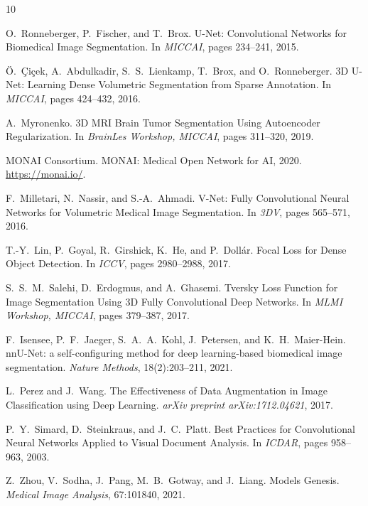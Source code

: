 \documentclass[10pt,twocolumn]{article}
\begin{document}

\begin{thebibliography}{10}

O.~Ronneberger, P.~Fischer, and T.~Brox.
\newblock U-Net: Convolutional Networks for Biomedical Image Segmentation.
\newblock In \emph{MICCAI}, pages 234--241, 2015.

\"{O}.~\c{C}i\c{c}ek, A.~Abdulkadir, S.~S.~Lienkamp, T.~Brox, and O.~Ronneberger.
\newblock 3D U-Net: Learning Dense Volumetric Segmentation from Sparse Annotation.
\newblock In \emph{MICCAI}, pages 424--432, 2016.

A.~Myronenko.
\newblock 3D MRI Brain Tumor Segmentation Using Autoencoder Regularization.
\newblock In \emph{BrainLes Workshop, MICCAI}, pages 311--320, 2019.

{MONAI Consortium}.
\newblock MONAI: Medical Open Network for AI, 2020.
\newblock \url{https://monai.io/}.

F.~Milletari, N.~Nassir, and S.-A.~Ahmadi.
\newblock V-Net: Fully Convolutional Neural Networks for Volumetric Medical Image Segmentation.
\newblock In \emph{3DV}, pages 565--571, 2016.

T.-Y.~Lin, P.~Goyal, R.~Girshick, K.~He, and P.~Doll\'{a}r.
\newblock Focal Loss for Dense Object Detection.
\newblock In \emph{ICCV}, pages 2980--2988, 2017.

S.~S.~M.~Salehi, D.~Erdogmus, and A.~Ghasemi.
\newblock Tversky Loss Function for Image Segmentation Using 3D Fully Convolutional Deep Networks.
\newblock In \emph{MLMI Workshop, MICCAI}, pages 379--387, 2017.

F.~Isensee, P.~F.~Jaeger, S.~A.~A.~Kohl, J.~Petersen, and K.~H.~Maier-Hein.
\newblock nnU-Net: a self-configuring method for deep learning-based biomedical image segmentation.
\newblock \emph{Nature Methods}, 18(2):203--211, 2021.

L.~Perez and J.~Wang.
\newblock The Effectiveness of Data Augmentation in Image Classification using Deep Learning.
\newblock \emph{arXiv preprint arXiv:1712.04621}, 2017.

P.~Y.~Simard, D.~Steinkraus, and J.~C.~Platt.
\newblock Best Practices for Convolutional Neural Networks Applied to Visual Document Analysis.
\newblock In \emph{ICDAR}, pages 958--963, 2003.

Z.~Zhou, V.~Sodha, J.~Pang, M.~B.~Gotway, and J.~Liang.
\newblock Models Genesis.
\newblock \emph{Medical Image Analysis}, 67:101840, 2021.

\end{thebibliography}
\end{document}
